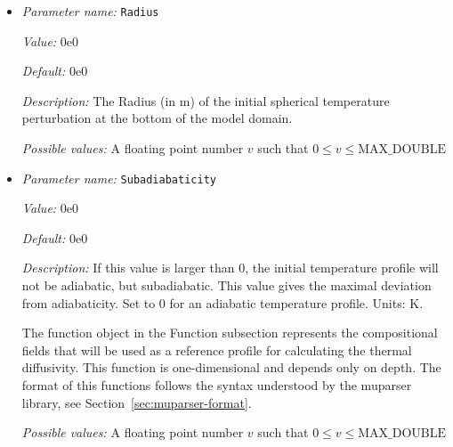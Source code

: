 \begin{itemize}
{\it Value:} center


{\it Default:} center


{\it Description:} Where the initial temperature perturbation should be placed. If `center' is given, then the perturbation will be centered along a `midpoint' of some sort of the bottom boundary. For example, in the case of a box geometry, this is the center of the bottom face; in the case of a spherical shell geometry, it is along the inner surface halfway between the bounding radial lines.


{\it Possible values:} Any one of center
\item {\it Parameter name:} {\tt Radius}
\label{parameters:Initial temperature model/Adiabatic/Radius}


{\it Value:} 0e0


{\it Default:} 0e0


{\it Description:} The Radius (in m) of the initial spherical temperature perturbation at the bottom of the model domain.


{\it Possible values:} A floating point number $v$ such that $0 \leq v \leq \text{MAX\_DOUBLE}$
\item {\it Parameter name:} {\tt Subadiabaticity}
\label{parameters:Initial temperature model/Adiabatic/Subadiabaticity}


{\it Value:} 0e0


{\it Default:} 0e0


{\it Description:} If this value is larger than 0, the initial temperature profile will not be adiabatic, but subadiabatic. This value gives the maximal deviation from adiabaticity. Set to 0 for an adiabatic temperature profile. Units: K.

The function object in the Function subsection represents the compositional fields that will be used as a reference profile for calculating the thermal diffusivity. This function is one-dimensional and depends only on depth. The format of this functions follows the syntax understood by the muparser library, see Section~\ref{sec:muparser-format}.


{\it Possible values:} A floating point number $v$ such that $0 \leq v \leq \text{MAX\_DOUBLE}$
\end{itemize}




